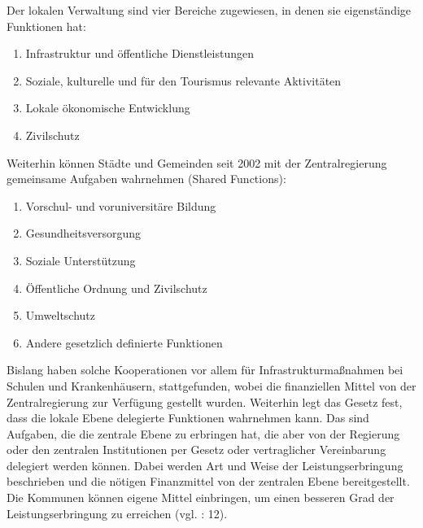 Der lokalen Verwaltung sind vier Bereiche zugewiesen, in denen sie eigenständige Funktionen hat: 
\begin{enumerate}[label={\arabic*}.] \itemsep1pt \parskip0pt 
\item Infrastruktur und öffentliche Dienstleistungen
\item Soziale, kulturelle und für den Tourismus relevante Aktivitäten
\item Lokale ökonomische Entwicklung
\item Zivilschutz
\end{enumerate}
Weiterhin können Städte und Gemeinden seit 2002 mit der Zentralregierung gemeinsame Aufgaben wahrnehmen (Shared Functions): 

\begin{enumerate}[label={\arabic*}.] \itemsep1pt \parskip0pt 
\item Vorschul- und voruniversitäre Bildung
\item Gesundheitsversorgung 
\item Soziale Unterstützung
\item Öffentliche Ordnung und Zivilschutz
\item Umweltschutz
\item Andere gesetzlich definierte Funktionen
\end{enumerate}
Bislang haben solche Kooperationen vor allem für Infrastrukturmaßnahmen bei Schulen und Krankenhäusern, stattgefunden, wobei die finanziellen Mittel von der Zentralregierung zur Verfügung gestellt wurden. Weiterhin legt das Gesetz fest, dass die lokale Ebene delegierte Funktionen wahrnehmen kann. Das sind Aufgaben, die die zentrale Ebene zu erbringen hat, die aber von der Regierung oder den zentralen Institutionen per Gesetz oder vertraglicher Vereinbarung delegiert werden können. Dabei werden Art und Weise der Leistungserbringung beschrieben und die nötigen Finanzmittel von der zentralen Ebene bereitgestellt. Die Kommunen können eigene Mittel einbringen, um einen besseren Grad der Leistungserbringung zu erreichen (vgl. \cite{did} : 12).\par
